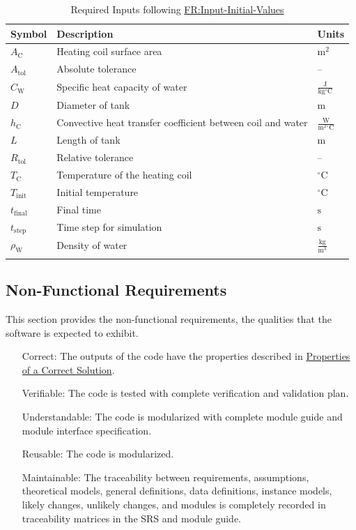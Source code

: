 \documentclass[12pt]{article}
\begin{document}
\begin{longtabu}{l X[l] l}
\toprule
\textbf{Symbol} & \textbf{Description} & \textbf{Units}
\\
\midrule
\endhead
${A_{\text{C}}}$ & Heating coil surface area & ${\text{m}^{2}}$
\\
${A_{\text{tol}}}$ & Absolute tolerance & --
\\
${C_{\text{W}}}$ & Specific heat capacity of water & $\frac{\text{J}}{\text{kg}{}^{\circ}\text{C}}$
\\
$D$ & Diameter of tank & ${\text{m}}$
\\
${h_{\text{C}}}$ & Convective heat transfer coefficient between coil and water & $\frac{\text{W}}{\text{m}^{2}{}^{\circ}\text{C}}$
\\
$L$ & Length of tank & ${\text{m}}$
\\
${R_{\text{tol}}}$ & Relative tolerance & --
\\
${T_{\text{C}}}$ & Temperature of the heating coil & ${{}^{\circ}\text{C}}$
\\
${T_{\text{init}}}$ & Initial temperature & ${{}^{\circ}\text{C}}$
\\
${t_{\text{final}}}$ & Final time & ${\text{s}}$
\\
${t_{\text{step}}}$ & Time step for simulation & ${\text{s}}$
\\
${ρ_{\text{W}}}$ & Density of water & $\frac{\text{kg}}{\text{m}^{3}}$
\\
\bottomrule
\caption{Required Inputs following \hyperref[inputInitVals]{FR:Input-Initial-Values}}
\label{Table:ReqInputs}
\end{longtabu}
\subsection{Non-Functional Requirements}
\label{Sec:NFRs}
This section provides the non-functional requirements, the qualities that the software is expected to exhibit.

\begin{itemize}
\item[Correct:\phantomsection\label{correct}]{The outputs of the code have the properties described in \hyperref[Sec:CorSolProps]{Properties of a Correct Solution}.}
\item[Verifiable:\phantomsection\label{verifiable}]{The code is tested with complete verification and validation plan.}
\item[Understandable:\phantomsection\label{understandable}]{The code is modularized with complete module guide and module interface specification.}
\item[Reusable:\phantomsection\label{reusable}]{The code is modularized.}
\item[Maintainable:\phantomsection\label{maintainable}]{The traceability between requirements, assumptions, theoretical models, general definitions, data definitions, instance models, likely changes, unlikely changes, and modules is completely recorded in traceability matrices in the SRS and module guide.}
\end{itemize}
\end{document}
